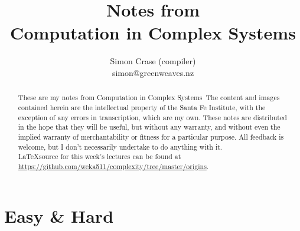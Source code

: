 \documentclass[]{article}
\title{
	Notes from \\
	Computation in Complex Systems
}
\author{Simon Crase (compiler)\\simon@greenweaves.nz}
\begin{document}
\maketitle

\begin{abstract}
   These are my notes from Computation in Complex Systems\
   The content and images contained herein are the intellectual property of the Santa Fe Institute, with the exception of any errors in transcription, which are my own.
   These notes are distributed in the hope that they will be useful,
   but without any warranty, and without even the implied warranty of
   merchantability or fitness for a particular purpose. All feedback is welcome,
   but I don't necessarily undertake to do anything with it.\\
   \LaTeX source for this week's lectures can be found at\\
   \url{https://github.com/weka511/complexity/tree/master/origins}.
\end{abstract}

\setcounter{tocdepth}{2}
\tableofcontents

\listoffigures







\section{Easy \& Hard}

\cite[Chapters 1,2,4]{moore2011nature}
\end{document}
